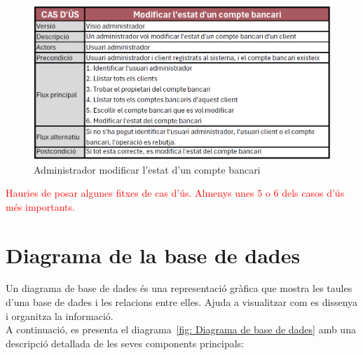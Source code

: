 \documentclass[a4paper,12pt,twoside]{ThesisStyle}
\newcommand{\pau}[1]{\textcolor{red}{#1}}
\begin{document}
\begin{figure}[h]
    \centering
    \includegraphics[width=1\textwidth]{imatges/f5.png}
    \caption{Administrador modificar l'estat d'un compte bancari}
    \label{fig:Administrador modificar l'estat d'un compte bancari}
\end{figure}


\pau{Hauries de posar algunes fitxes de cas d'ús. Almenys unes 5 o 6 dels casos d'ús més importants.}

\clearpage
\section{Diagrama de la base de dades}
\label{sec: diagrama de base de dades}

Un diagrama de base de dades és una representació gràfica que mostra les taules d'una base de dades i les relacions entre elles. Ajuda a visualitzar com es dissenya i organitza la informació.\\

A continuació, es presenta el diagrama~\ref{fig: Diagrama de base de dades} amb una descripció detallada de les seves components principals:
\end{document}
